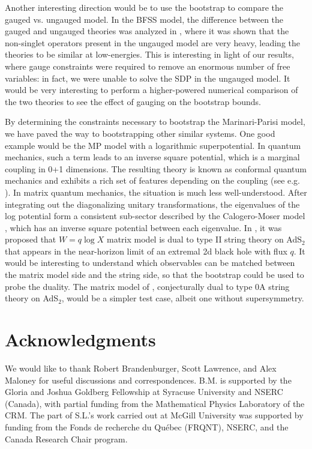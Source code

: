 \documentclass[a4paper,11pt]{article}
\numberwithin{equation}{section}
\begin{document}
Another interesting direction would be to use the bootstrap to compare the gauged vs. ungauged model. In the BFSS model, the difference between the gauged and ungauged theories was analyzed in \cite{Maldacena:2018vsr}, where it was shown that the non-singlet operators present in the ungauged model are very heavy, leading the theories to be similar at low-energies. This is interesting in light of our results, where gauge constraints were required to remove an enormous number of free variables: in fact, we were unable to solve the SDP in the ungauged model. It would be very interesting to perform a higher-powered numerical comparison of the two theories to see the effect of gauging on the bootstrap bounds. 

By determining the constraints necessary to bootstrap the Marinari-Parisi model, we have paved the way to bootstrapping other similar systems. One good example would be the MP model with a logarithmic superpotential. In quantum mechanics, such a term leads to an inverse square potential, which is a marginal coupling in 0+1 dimensions. The resulting theory is known as conformal quantum mechanics \cite{Jackiw:1972cb, deAlfaro:1976vlx} and exhibits a rich set of features depending on the coupling (see e.g. \cite{Gitman:2009era}). In matrix quantum mechanics, the situation is much less well-understood. After integrating out the diagonalizing unitary transformations, the eigenvalues of the log potential form a consistent sub-sector described by the Calogero-Moser model \cite{Dabholkar:1991te, Rodrigues:1992by}, which has an inverse square potential between each eigenvalue. In \cite{Verlinde:2004gt}, it was proposed that $W = q \log X$ matrix model is dual to type II string theory on AdS${}_2$ that appears in the near-horizon limit of an extremal 2d black hole with flux $q$. It would be interesting to understand which observables can be matched between the matrix model side and the string side, so that the bootstrap could be used to probe the duality. The matrix model of \cite{Strominger:2003tm}, conjecturally dual to type 0A string theory on AdS${}_2$, would be a simpler test case, albeit one without supersymmetry. 

\clearpage

\section*{Acknowledgments}

We would like to thank Robert Brandenburger, Scott Lawrence, and Alex Maloney for useful discussions and correspondences. B.M. is supported by the Gloria and Joshua Goldberg Fellowship at Syracuse University and NSERC (Canada), with partial funding from the
Mathematical Physics Laboratory of the CRM. The part of S.L.'s work carried out at McGill University was supported by funding from the Fonds de recherche du Québec (FRQNT), NSERC, and the Canada Research Chair program.
\end{document}
